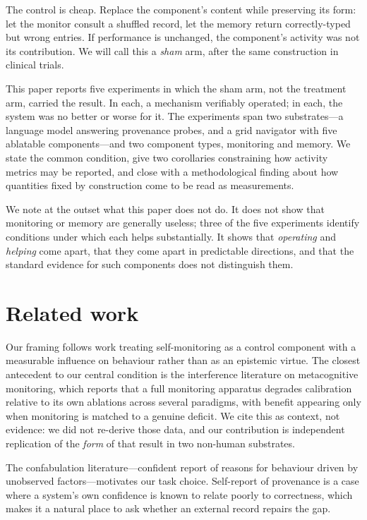 \documentclass[11pt]{article}
\begin{document}
The control is cheap. Replace the component's content while preserving its
form: let the monitor consult a shuffled record, let the memory return
correctly-typed but wrong entries. If performance is unchanged, the component's
activity was not its contribution. We will call this a \emph{sham} arm, after
the same construction in clinical trials.

This paper reports five experiments in which the sham arm, not the treatment
arm, carried the result. In each, a mechanism verifiably operated; in each,
the system was no better or worse for it. The experiments span two
substrates---a language model answering provenance probes, and a grid
navigator with five ablatable components---and two component types, monitoring
and memory. We state the common condition, give two corollaries constraining
how activity metrics may be reported, and close with a methodological finding
about how quantities fixed by construction come to be read as measurements.

We note at the outset what this paper does not do. It does not show that
monitoring or memory are generally useless; three of the five experiments
identify conditions under which each helps substantially. It shows that
\emph{operating} and \emph{helping} come apart, that they come apart in
predictable directions, and that the standard evidence for such components
does not distinguish them.

\section{Related work}

Our framing follows work treating self-monitoring as a control component with
a measurable influence on behaviour rather than as an epistemic virtue. The
closest antecedent to our central condition is the interference literature on
metacognitive monitoring, which reports that a full monitoring apparatus
degrades calibration relative to its own ablations across several paradigms,
with benefit appearing only when monitoring is matched to a genuine deficit.
We cite this as context, not evidence: we did not re-derive those data, and
our contribution is independent replication of the \emph{form} of that result
in two non-human substrates.

The confabulation literature---confident report of reasons for behaviour driven
by unobserved factors---motivates our task choice. Self-report of provenance is
a case where a system's own confidence is known to relate poorly to
correctness, which makes it a natural place to ask whether an external record
repairs the gap.
\end{document}
